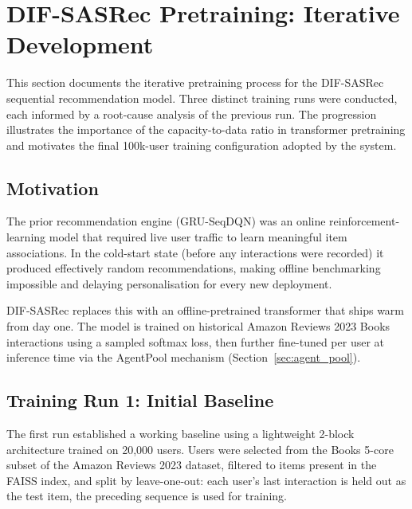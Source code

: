 \section{DIF-SASRec Pretraining: Iterative Development}
\label{sec:dif_sasrec_training}

This section documents the iterative pretraining process for the DIF-SASRec sequential recommendation model.
Three distinct training runs were conducted, each informed by a root-cause analysis of the previous run.
The progression illustrates the importance of the capacity-to-data ratio in transformer pretraining and motivates the final 100k-user training configuration adopted by the system.

\subsection{Motivation}

The prior recommendation engine (GRU-SeqDQN) was an online reinforcement-learning model that required live user traffic to learn meaningful item associations.
In the cold-start state (before any interactions were recorded) it produced effectively random recommendations, making offline benchmarking impossible and delaying personalisation for every new deployment.

DIF-SASRec replaces this with an offline-pretrained transformer that ships warm from day one.
The model is trained on historical Amazon Reviews 2023 Books interactions using a sampled softmax loss, then further fine-tuned per user at inference time via the AgentPool mechanism (Section~\ref{sec:agent_pool}).

\subsection{Training Run 1: Initial Baseline}
\label{sec:train_run1}

The first run established a working baseline using a lightweight 2-block architecture trained on 20{,}000 users.
Users were selected from the Books 5-core subset of the Amazon Reviews 2023 dataset, filtered to items present in the FAISS index, and split by leave-one-out: each user's last interaction is held out as the test item, the preceding sequence is used for training.

